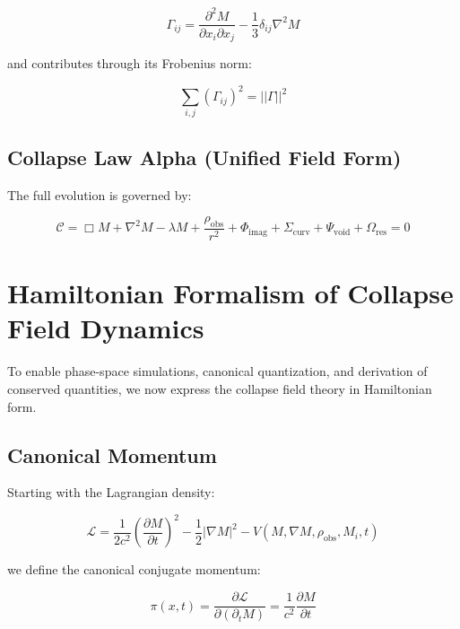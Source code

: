 \begin{equation}
\Gamma_{ij} = \frac{\partial^2 M}{\partial x_i \partial x_j} - \frac{1}{3} \delta_{ij} \nabla^2 M
\end{equation}

and contributes through its Frobenius norm:

\begin{equation}
\sum_{i,j} (\Gamma_{ij})^2 = ||\Gamma||^2
\end{equation}

\subsection{Collapse Law Alpha (Unified Field Form)}

The full evolution is governed by:

\begin{equation}
\boxed{
\mathcal{C} = \Box M 
+ \nabla^2 M 
- \lambda M 
+ \frac{\rho_{\text{obs}}}{r^2} 
+ \Phi_{\text{imag}} 
+ \Sigma_{\text{curv}} 
+ \Psi_{\text{void}} 
+ \Omega_{\text{res}} 
= 0
}
\end{equation}


\section{Hamiltonian Formalism of Collapse Field Dynamics}

To enable phase-space simulations, canonical quantization, and derivation of conserved quantities, we now express the collapse field theory in Hamiltonian form.

\subsection{Canonical Momentum}

Starting with the Lagrangian density:

\begin{equation}
\mathcal{L} = \frac{1}{2c^2} \left( \frac{\partial M}{\partial t} \right)^2 - \frac{1}{2} |\nabla M|^2 - V(M, \nabla M, \rho_{\text{obs}}, M_i, t)
\end{equation}

we define the canonical conjugate momentum:

\begin{equation}
\pi(x,t) = \frac{\partial \mathcal{L}}{\partial (\partial_t M)} = \frac{1}{c^2} \frac{\partial M}{\partial t}
\end{equation}

